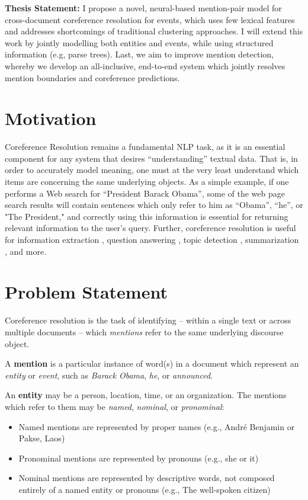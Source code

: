 \textbf{Thesis Statement:} I propose a novel, neural-based mention-pair model for cross-document coreference resolution for events, which uses few lexical features and addresses shortcomings of traditional clustering approaches.  I will extend this work by jointly modelling both entities and events, while using structured information (e.g, parse trees).  Last, we aim to improve mention detection, whereby we develop an all-inclusive, end-to-end system which jointly resolves mention boundaries and coreference predictions.

\vspace{10mm}

\section{Motivation}
Coreference Resolution remains a fundamental NLP task, as it is an essential component for any system that desires ``understanding'' textual data.  That is, in order to accurately model meaning, one must at the very least understand which items are concerning the same underlying objects.  As a simple example, if one performs a Web search for ``President Barack Obama'', some of the web page search results will contain sentences which only refer to him as ``Obama'', ``he'', or "The President," and correctly using this information is essential for returning relevant information to the user's query.  Further, coreference resolution is useful for information extraction \cite{Humphreys:1997:ECI:1598819.1598830}, question answering \cite{Narayanan:2004:QAB:1220355.1220455}, topic detection \cite{Allan:1998}, summarization \cite{Daniel:2003}, and more.

\section{Problem Statement}
Coreference resolution is the task of identifying -- within a single text or across multiple documents -- which \textit{mentions} refer to the same underlying discourse object. 

A \textbf{mention} is a particular instance of word(s) in a document which represent an \textit{entity} or \textit{event}, such as \textit{Barack Obama}, \textit{he}, or \textit{announced}.

An \textbf{entity} may be a person, location, time, or an organization.  The mentions which refer to them may be \textit{named}, \textit{nominal}, or \textit{pronominal}:
\begin{itemize}
\item Named mentions are represented by proper names (e.g., Andr\'e Benjamin or Pakse, Laos) 
\item Pronominal mentions are represented by pronouns (e.g., she or it)
\item Nominal mentions are represented by descriptive words, not composed entirely of a named entity or pronouns (e.g., The well-spoken citizen)
\end{itemize}

